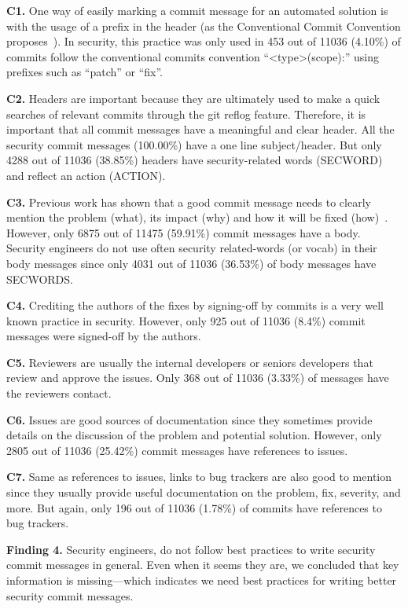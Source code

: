 \textbf{C1.} One way of easily marking a commit message for an automated solution is with the usage of a prefix in the header (as the Conventional Commit Convention proposes~\cite{convcom}). In security, this practice was only used in 453 out of 11036 (4.10\%) of commits follow the conventional commits convention ``<type>(scope):'' using prefixes such as ``patch'' or ``fix''.

\textbf{C2.} Headers are important because they are ultimately used to make a quick searches of relevant commits through the git reflog feature. Therefore, it is important that all commit messages have a meaningful and clear header. All the security commit messages (100.00\%) have a one line subject/header. But only 4288 out of 11036 (38.85\%) headers have security-related words (SECWORD) and reflect an action (ACTION).

\textbf{C3.} Previous work has shown that a good commit message needs to clearly mention the problem (what), its impact (why) and how it will be fixed (how)~\cite{Tian_2022}. However, only 6875 out of 11475 (59.91\%) commit messages have a body. Security engineers do not use often security related-words (or vocab) in their body messages since only 4031 out of 11036 (36.53\%) of body messages have SECWORDS.

\textbf{C4.} Crediting the authors of the fixes by signing-off by commits is a very well known practice in security. However, only 925 out of 11036 (8.4\%) commit messages were signed-off by the authors.

\textbf{C5.} Reviewers are usually the internal developers or seniors developers that review and approve the issues. Only 368 out of 11036 (3.33\%) of messages have the reviewers contact.

\textbf{C6.} Issues are good sources of documentation since they sometimes provide details on the discussion of the problem and potential solution. However, only 2805 out of 11036 (25.42\%) commit messages have references to issues.

\textbf{C7.} Same as references to issues, links to bug trackers are also good to mention since they usually provide useful documentation on the problem, fix, severity, and more. But again, only 196 out of 11036 (1.78\%) of commits have references to bug trackers.


\textbf{Finding 4.} Security engineers, do not follow best practices to write security commit messages in general. Even when it seems they are, we concluded that key information is missing---which indicates we need best practices for writing better security commit messages. 


